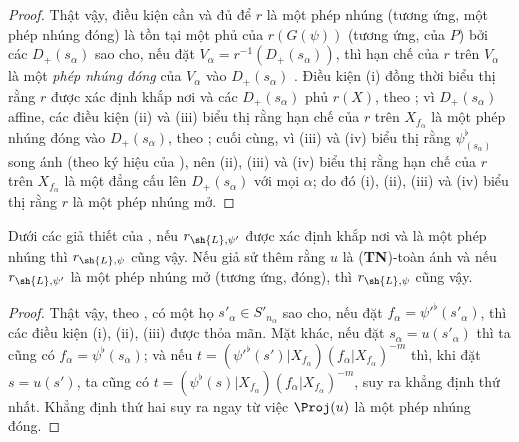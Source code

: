 \documentclass[oneside,10pt]{amsart}
\let\EGAOriginalLabel\label
\renewcommand{\label}[1]{\phantomsection\EGAOriginalLabel{#1}}
\begin{document}
\begin{proof}
Thật vậy, điều kiện cần và đủ để $r$ là một phép nhúng (tương ứng, một phép nhúng đóng) là tồn tại một phủ của $r(G(\psi))$ (tương ứng, của $P$) bởi các $D_+(s_\alpha)$ sao cho, nếu đặt $V_\alpha=r^{-1}(D_+(s_\alpha))$, thì hạn chế của $r$ trên $V_\alpha$ là một \emph{phép nhúng đóng} của $V_\alpha$ vào $D_+(s_\alpha)$ .
Điều kiện (i) đồng thời biểu thị rằng $r$ được xác định khắp nơi và các $D_+(s_\alpha)$ phủ $r(X)$, theo ;
vì $D_+(s_\alpha)$ affine, các điều kiện (ii) và (iii) biểu thị rằng hạn chế của $r$ trên $X_{f_\alpha}$ là một phép nhúng đóng vào $D_+(s_\alpha)$, theo ;
cuối cùng, vì (iii) và (iv) biểu thị rằng $\psi_{(s_\alpha)}^\flat$ song ánh (theo ký hiệu của ), nên (ii), (iii) và (iv) biểu thị rằng hạn chế của $r$ trên $X_{f_\alpha}$ là một đẳng cấu lên $D_+(s_\alpha)$ với mọi $\alpha$;
do đó (i), (ii), (iii) và (iv) biểu thị rằng $r$ là một phép nhúng mở.
\end{proof}

\begin{corollary}[3.8.3]
\label{II.3.8.3}
Dưới các giả thiết của , nếu $r_{\sh{L},\psi'}$ được xác định khắp nơi và là một phép nhúng thì $r_{\sh{L},\psi}$ cũng vậy.
Nếu giả sử thêm rằng $u$ là (\textbf{TN})-toàn ánh và nếu $r_{\sh{L},\psi'}$ là một phép nhúng mở (tương ứng, đóng), thì $r_{\sh{L},\psi}$ cũng vậy.
\end{corollary}

\begin{proof}
Thật vậy, theo , có một họ $s'_\alpha\in S'_{n_\alpha}$ sao cho, nếu đặt $f_\alpha=\psi'^\flat(s'_\alpha)$, thì các điều kiện (i), (ii), (iii) được thỏa mãn.
Mặt khác, nếu đặt $s_\alpha=u(s'_\alpha)$ thì ta cũng có $f_\alpha=\psi^\flat(s_\alpha)$; và nếu $t=(\psi'^\flat(s')|X_{f_\alpha})(f_\alpha|X_{f_\alpha})^{-m}$ thì, khi đặt $s=u(s')$, ta cũng có $t=(\psi^\flat(s)|X_{f_\alpha})(f_\alpha|X_{f_\alpha})^{-m}$, suy ra khẳng định thứ nhất.
Khẳng định thứ hai suy ra ngay từ việc $\Proj(u)$ là một phép nhúng đóng.
\end{proof}
\end{document}
